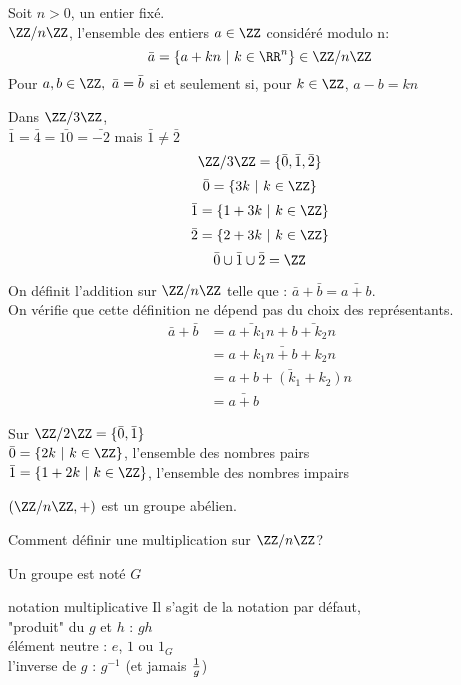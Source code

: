 \documentclass[../main.tex]{subfile}
\begin{document}
\begin{ex}
\begin{ex}
	Soit $n > 0$, un entier fixé.\\
	$\ZZ / n\ZZ$, l'ensemble des entiers $a \in \ZZ$ considéré modulo n:\\
	$$\bar{a} = \{a + kn \ | \ k \in \RR^n\} \in \ZZ / n\ZZ$$
	Pour $a, b \in \ZZ, \ \bar{a} = \bar{b}$ si et seulement si, pour $k \in \ZZ$, $a-b = kn$
\begin{ex}	
	Dans $\ZZ / 3\ZZ$, \\
	$\bar{1} = \bar{4} = \bar{10} = \bar{-2}$ mais $\bar{1} \neq \bar{2}$\\
	$$\ZZ / 3\ZZ = \{\bar{0}, \bar{1}, \bar{2}\}$$
	$$\bar{0} = \{3k \ | \ k \in \ZZ\}$$
	$$\bar{1} = \{1 + 3k \ | \ k \in \ZZ\}$$
	$$\bar{2} = \{2 + 3k \ | \ k \in \ZZ\}$$
	$$\bar{0} \cup \bar{1} \cup \bar{2} = \ZZ$$
\end{ex}
	On définit l'addition sur $\ZZ / n\ZZ$ telle que : $\bar{a} + \bar{b} = \bar{a+b}$.\\
	On vérifie que cette définition ne dépend pas du choix des représentants.\\
	$$
\begin{aligned}
	\bar{a} + \bar{b} &= \bar{a+k_1n} + \bar{b+k_2n}\\
	&= \bar{a+k_1n + b+k_2n}\\
	&= \bar{a+b+(k_1+k_2)n}\\
	&= \bar{a+b}
\end{aligned}
	$$
\begin{rema}	
	Sur $\ZZ/2\ZZ = \{\bar{0}, \bar{1}\}$\\
	$\bar{0} = \{2k \ |\ k \in \ZZ\}$, l'ensemble des nombres pairs\\
	$\bar{1} = \{1 + 2k \ |\ k \in \ZZ\}$, l'ensemble des nombres impairs\\
\end{rema}
	$(\ZZ / n\ZZ, +)$ est un groupe abélien.\\
\begin{rema}	
	Comment définir une multiplication sur $\ZZ / n\ZZ$?
\end{rema}
\end{ex}

\begin{nota}
	Un groupe est noté $G$
\end{nota}

\begin{nota}{notation multiplicative}
	Il s'agit de la notation par défaut, \\
	"produit" du $g$ et $h$ : $gh$\\
	élément neutre : $e$, $1$ ou $1_G$\\
	l'inverse de $g$ : $g^{-1}$ (et jamais $1 \over g$)
\end{nota}


\end{ex}
\end{document}
